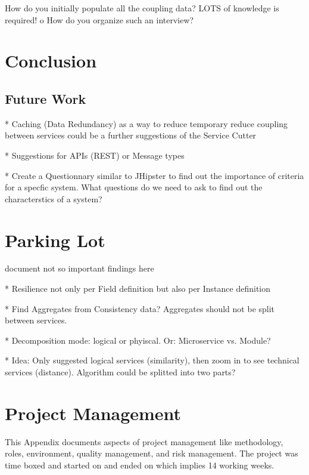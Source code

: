 \documentclass[hsr-ba,english]{hgbthesis}
\begin{document}
How do you initially populate all the coupling data? LOTS of knowledge is required!
o   How do you organize such an interview?

\chapter{Conclusion}


\section{Future Work}

* Caching (Data Redundancy) as a way to reduce temporary reduce coupling between services could be a further suggestions of the Service Cutter

* Suggestions for APIs (REST) or Message types 

* Create a Questionnary similar to JHipster to find out the importance of criteria for a specfic system. What questions do we need to ask to find out the characterstics of a system? 


\appendix



\chapter{Parking Lot}
document not so important findings here	

* Resilience not only per Field definition but also per Instance definition 

* Find Aggregates from Consistency data? Aggregates should not be split between services.

* Decomposition mode: logical or phyiscal. Or: Microservice vs. Module?

* Idea: Only suggested logical services (similarity), then zoom in to see technical services (distance). Algorithm could be splitted into two parts?


\chapter{Project Management}
\label{cha:projectmgmt}

This Appendix documents aspects of project management like methodology, roles, environment, quality management, and risk management. The project was time boxed and started on  and ended on  which implies 14 working weeks. 
\end{document}
